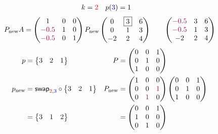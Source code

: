 \documentclass[pdf]{beamer}
\begin{document}
\begin{frame}{}\begin{align*} k &= {\color{red}2} & p({\color{blue}3}) &= 1\end{align*} $$P_{\text{new}}A=\begin{pmatrix}1&0&0\\{\color{purple}-0.5}&1&0\\{\color{purple}-0.5}&0&1\end{pmatrix} P_{\text{new}} \begin{pmatrix}0&\boxed{3}&6\\0&1&3\\-2&2&4\end{pmatrix} \quad\quad \begin{pmatrix}{\color{purple}-0.5}&3&6\\{\color{purple}-0.5}&1&3\\-2&2&4\end{pmatrix}$$ \begin{align*} p&= \begin{Bmatrix}3&2&1\end{Bmatrix} & P&= \begin{pmatrix}0&0&1\\0&1&0\\1&0&0\end{pmatrix}\\ p_{\text{new}} &= \mathsf{swap}_{{\color{red}2},{\color{blue}3}} \circ \begin{Bmatrix}3&2&1\end{Bmatrix} & P_{\text{new}} &= \begin{pmatrix}1&0&0\\0&0&{\color{purple}1}\\0&{\color{purple}1}&0\end{pmatrix} \begin{pmatrix}0&0&1\\0&1&0\\1&0&0\end{pmatrix}\\ &=\begin{Bmatrix}3&1&2\end{Bmatrix} &&=\begin{pmatrix}0&0&1\\1&0&0\\0&1&0\end{pmatrix}\end{align*}\end{frame}
\end{document}
